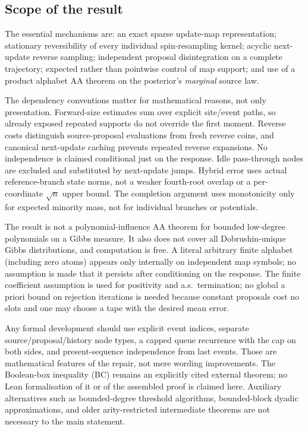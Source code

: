 \documentclass[11pt]{article}
\theoremstyle{definition}\newtheorem{definition}[theorem]{Definition}
\theoremstyle{remark}\newtheorem{remark}[theorem]{Remark}
\begin{document}
\subsection{Scope of the result}
The essential mechanisms are: an exact sparse update-map representation; stationary reversibility of every individual spin-resampling kernel; acyclic next-update reverse sampling; independent proposal disintegration on a complete trajectory; expected rather than pointwise control of map support; and use of a product alphabet AA theorem on the posterior's \emph{marginal} source law.

The dependency conventions matter for mathematical reasons, not only presentation. Forward-size estimates sum over explicit site/event paths, so already exposed repeated supports do not override the first moment. Reverse costs distinguish source-proposal evaluations from fresh reverse coins, and canonical next-update caching prevents repeated reverse expansions. No independence is claimed conditional just on the response. Idle pass-through nodes are excluded and substituted by next-update jumps. Hybrid error uses actual reference-branch state norms, not a weaker fourth-root overlap or a per-coordinate \(\sqrt n\) upper bound. The completion argument uses monotonicity only for expected minority mass, not for individual branches or potentials.

The result is not a polynomial-influence AA theorem for bounded low-degree polynomials on a Gibbs measure. It also does not cover all Dobrushin-unique Gibbs distributions, and computation is free. A literal arbitrary finite alphabet (including zero atoms) appears only internally on independent map symbols; no assumption is made that it persists after conditioning on the response. The finite coefficient assumption is used for positivity and a.s.\ termination; no global a priori bound on rejection iterations is needed because constant proposals cost no slots and one may choose a tape with the desired mean error.

Any formal development should use explicit event indices, separate source/proposal/history node types, a capped queue recurrence with the cap on both sides, and present-sequence independence from last events. Those are mathematical features of the repair, not mere wording improvements. The Boolean-box inequality (BC) remains an explicitly cited external theorem; no Lean formalisation of it or of the assembled proof is claimed here. Auxiliary alternatives such as bounded-degree threshold algorithms, bounded-block dyadic approximations, and older arity-restricted intermediate theorems are not necessary to the main statement.
\end{document}

